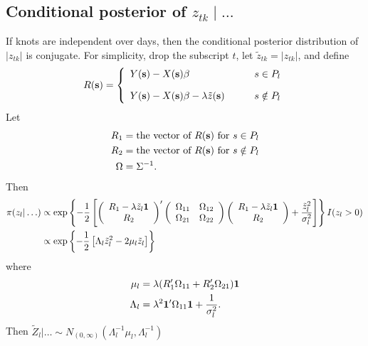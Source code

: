 \subsection*{Conditional posterior of $z_{tk} \mid \ldots $}\label{sts:mvcondu}
If knots are independent over days, then the conditional posterior distribution of $|z_{tk}|$ is conjugate.
For simplicity, drop the subscript $t$, let $\tilde{z}_{tk} = |z_{tk}|$, and define
\begin{align*}
R(\mathbf{s}) = \left\{
    \begin{array}{ll}
        Y(\mathbf{s}) - X(\mathbf{s}) \beta &s \in P_l\\[1em]
        Y(\mathbf{s}) - X(\mathbf{s}) \beta - \lambda \tilde{z}(\mathbf{s}) \qquad & s \notin P_l
    \end{array}
\right.
\end{align*}
Let
\begin{align*}
    R_1 &= \text{the vector of } R(\mathbf{s}) \text{ for } s \in P_l \\
    R_2 &= \text{the vector of } R(\mathbf{s}) \text{ for } s \notin P_l \\
    \Omega &= \Sigma^{-1}.
\end{align*}
Then
\begin{align*}
    \pi(z_l | \ldots) &\propto \exp \left\{ -\frac{ 1 }{ 2 } \left[
        \left( \begin{array}{c}
            R_1 - \lambda \tilde{z}_l \mathbf{1}\\
            R_2
        \end{array} \right)^\prime
        \left( \begin{array}{cc}
            \Omega_{11} & \Omega_{12}\\
            \Omega_{21} & \Omega_{22}
        \end{array} \right)
        \left( \begin{array}{c}
            R_1 - \lambda \tilde{z}_l \mathbf{1}\\
            R_2
        \end{array} \right)
        +  \frac{ {\tilde{z}_l}^2 }{ \sigma_l^2 }\right]
    \right\} I(z_l > 0) \\
        &\propto \exp \left\{ -\frac{ 1 }{ 2 } \left[ \Lambda_l {\tilde{z}_l}^2 - 2 \mu_l \tilde{z}_l \right] \right\}
\end{align*}
where
\begin{align*}
    \mu_l &= \lambda ( R_1^\prime \Omega_{11} + R_2^\prime \Omega_{21} )\mathbf{1}\\
    \Lambda_l &= \lambda^2 \mathbf{1}^\prime \Omega_{11} \mathbf{1} + \frac{ 1 }{ \sigma^2_l }.
\end{align*}
Then $\tilde{Z}_l | \ldots \sim N_{(0, \infty)} (\Lambda_l^{-1} \mu_l, \Lambda_l^{-1})$

